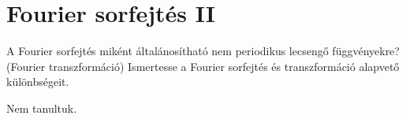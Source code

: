 \documentclass[../main.tex]{subfiles}
\begin{document}
\section{Fourier sorfejtés II}

\begin{fulltheorem}
  A Fourier sorfejtés miként általánosítható nem periodikus lecsengő
  függvényekre? (Fourier transzformáció) Ismertesse a Fourier sorfejtés
  és transzformáció alapvető különbségeit.
\end{fulltheorem}

Nem tanultuk.
\end{document}
